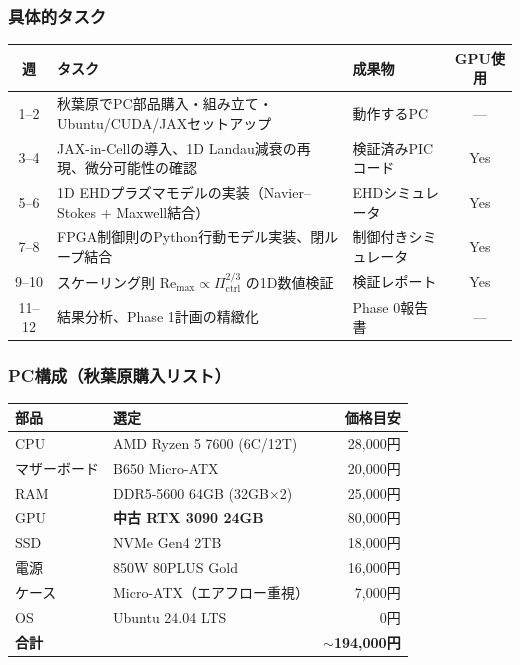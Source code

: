\documentclass[12pt,a4paper]{ltjsarticle}
\begin{document}
\subsubsection{具体的タスク}

\begin{center}
\sffamily\small
\begin{tabular}{@{}cp{6cm}p{3cm}c@{}}
\toprule
\textbf{週} & \textbf{タスク} & \textbf{成果物} & \textbf{GPU使用} \\
\midrule
1--2 & 秋葉原でPC部品購入・組み立て・Ubuntu/CUDA/JAXセットアップ & 動作するPC & --- \\
3--4 & JAX-in-Cellの導入、1D Landau減衰の再現、微分可能性の確認 & 検証済みPICコード & Yes \\
5--6 & 1D EHDプラズマモデルの実装（Navier--Stokes + Maxwell結合） & EHDシミュレータ & Yes \\
7--8 & FPGA制御則のPython行動モデル実装、閉ループ結合 & 制御付きシミュレータ & Yes \\
9--10 & スケーリング則 $\mathrm{Re}_{\max} \propto \Pi_{\mathrm{ctrl}}^{2/3}$ の1D数値検証 & 検証レポート & Yes \\
11--12 & 結果分析、Phase 1計画の精緻化 & Phase 0報告書 & --- \\
\bottomrule
\end{tabular}
\end{center}

\subsubsection{PC構成（秋葉原購入リスト）}

\begin{center}
\sffamily\small
\begin{tabular}{@{}llr@{}}
\toprule
\textbf{部品} & \textbf{選定} & \textbf{価格目安} \\
\midrule
CPU & AMD Ryzen 5 7600 (6C/12T) & 28,000円 \\
マザーボード & B650 Micro-ATX & 20,000円 \\
RAM & DDR5-5600 64GB (32GB$\times$2) & 25,000円 \\
GPU & \textbf{中古 RTX 3090 24GB} & 80,000円 \\
SSD & NVMe Gen4 2TB & 18,000円 \\
電源 & 850W 80PLUS Gold & 16,000円 \\
ケース & Micro-ATX（エアフロー重視） & 7,000円 \\
OS & Ubuntu 24.04 LTS & 0円 \\
\midrule
\textbf{合計} & & \textbf{$\sim$194,000円} \\
\bottomrule
\end{tabular}
\end{center}
\end{document}
